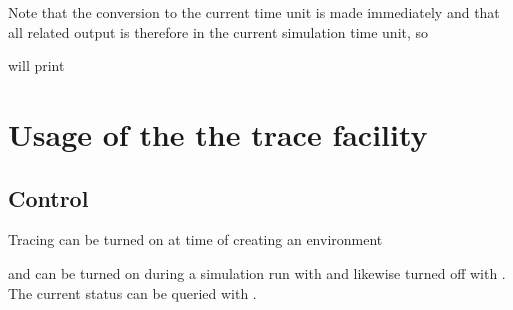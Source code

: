 \documentclass[letterpaper,10pt,english]{sphinxmanual}
\begin{document}
Note that the conversion to the current time unit is made immediately and that all related output
is therefore in the current simulation time unit, so

\begin{sphinxVerbatim}[commandchars=\\\{\}]
\end{sphinxVerbatim}

will print

\begin{sphinxVerbatim}[commandchars=\\\{\}]
  
  
\end{sphinxVerbatim}


\section{Usage of the the trace facility}
\label{\detokenize{Miscellaneous:usage-of-the-the-trace-facility}}

\subsection{Control}
\label{\detokenize{Miscellaneous:control}}
Tracing can be turned on at time of creating an environment

\begin{sphinxVerbatim}[commandchars=\\\{\}]
  
\end{sphinxVerbatim}

and can be turned on during a simulation run with  and likewise
turned off with . The current status can be queried with .
\end{document}
